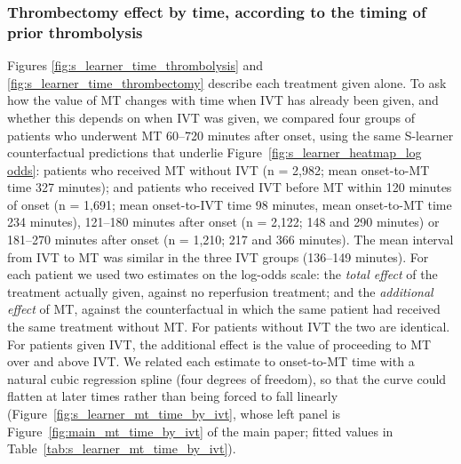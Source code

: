 
\subsubsection{Thrombectomy effect by time, according to the timing of prior thrombolysis}\label{sec:te_sl_mt_time_by_ivt}

Figures \ref{fig:s_learner_time_thrombolysis} and \ref{fig:s_learner_time_thrombectomy} describe each treatment given alone. To ask how the value of MT changes with time when IVT has already been given, and whether this depends on when IVT was given, we compared four groups of patients who underwent MT 60--720 minutes after onset, using the same S-learner counterfactual predictions that underlie Figure~\ref{fig:s_learner_heatmap_log odds}: patients who received MT without IVT (n = 2,982; mean onset-to-MT time 327 minutes); and patients who received IVT before MT within 120 minutes of onset (n = 1,691; mean onset-to-IVT time 98 minutes, mean onset-to-MT time 234 minutes), 121--180 minutes after onset (n = 2,122; 148 and 290 minutes) or 181--270 minutes after onset (n = 1,210; 217 and 366 minutes). The mean interval from IVT to MT was similar in the three IVT groups (136--149 minutes). For each patient we used two estimates on the log-odds scale: the \emph{total effect} of the treatment actually given, against no reperfusion treatment; and the \emph{additional effect} of MT, against the counterfactual in which the same patient had received the same treatment without MT. For patients without IVT the two are identical. For patients given IVT, the additional effect is the value of proceeding to MT over and above IVT. We related each estimate to onset-to-MT time with a natural cubic regression spline (four degrees of freedom), so that the curve could flatten at later times rather than being forced to fall linearly (Figure~\ref{fig:s_learner_mt_time_by_ivt}, whose left panel is Figure~\ref{fig:main_mt_time_by_ivt} of the main paper; fitted values in Table~\ref{tab:s_learner_mt_time_by_ivt}).

